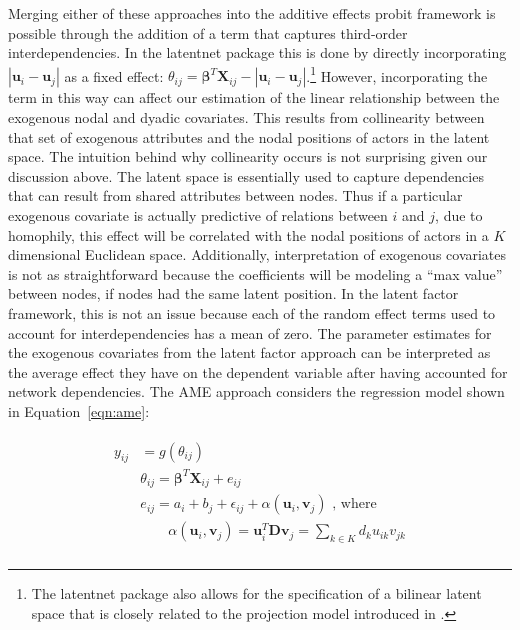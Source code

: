 \documentclass[12pt,pdflatex]{elsarticle}
\newcommand{\pkg}[1]{{\fontseries{b}\selectfont #1}}
\begin{document}
Merging either of these approaches into the additive effects probit framework is possible through the addition of a term that captures third-order interdependencies. In the \pkg{latentnet} package this is done by directly incorporating $|\textbf{u}_{i} - \textbf{u}_{j}|$ as a fixed effect: $\theta_{ij} = \bm\beta^{T} \mathbf{X}_{ij} - |\textbf{u}_{i} - \textbf{u}_{j}|$.\footnote{The \pkg{latentnet} package also allows for the specification of a bilinear latent space that is closely related to the projection model introduced in \citet{hoff:etal:2002}.} However, incorporating the term in this way can affect our estimation of the linear relationship between the exogenous nodal and dyadic covariates. This results from collinearity between that set of exogenous attributes and the nodal positions of actors in the latent space. The intuition behind why collinearity occurs is not surprising given our discussion above. The latent space is essentially used to capture dependencies that can result from shared attributes between nodes. Thus if a particular exogenous covariate is actually predictive of relations between $i$ and $j$, due to homophily, this effect will be correlated with the nodal positions of actors in a $K$ dimensional Euclidean space. Additionally, interpretation of exogenous covariates is not as straightforward because the coefficients will be modeling a ``max value'' between nodes, if nodes had the same latent position. In the latent factor framework, this is not an issue because each of the random effect terms used to account for interdependencies has a mean of zero. The parameter estimates for the exogenous covariates from the latent factor approach can be interpreted as the average effect they have on the dependent variable after having accounted for network dependencies. The AME approach considers the regression model shown in Equation~\ref{eqn:ame}:

\begin{align}
\begin{aligned}
	y_{ij} &= g(\theta_{ij}) \\ 
	&\theta_{ij} = \bm\beta^{T} \mathbf{X}_{ij} + e_{ij} \\
	&e_{ij} = a_{i} + b_{j}  + \epsilon_{ij} + \alpha(\textbf{u}_{i}, \textbf{v}_{j}) \text{  , where } \\
	&\qquad \alpha(\textbf{u}_{i}, \textbf{v}_{j}) = \textbf{u}_{i}^{T} \textbf{D} \textbf{v}_{j} = \sum_{k \in K} d_{k} u_{ik} v_{jk} \\ 
\label{eqn:ame}
\end{aligned}
\end{align}
\end{document}
